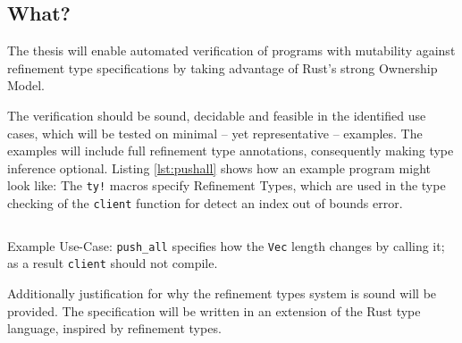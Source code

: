 \documentclass[11pt]{article}
\newcommand{\code}[1]{\texttt{#1}}
\begin{document}






\subsection{What?}

The thesis will enable automated verification of programs with mutability against refinement type specifications by taking advantage of Rust's strong Ownership Model.

The verification should be sound, decidable and feasible in the identified use cases, which will be tested on minimal -- yet representative -- examples. The examples will include full refinement type annotations, consequently making type inference optional. Listing \ref{lst:pushall} shows how an example program might look like: The \code{ty!} macros specify Refinement Types, which are used in the type checking of the \code{client} function for detect an index out of bounds error.


\begin{listing}
	\inputminted[fontsize=\footnotesize]{rust}{./pushall.rs}
	\caption{Example Use-Case: \code{push\_all} specifies how the \code{Vec} length changes by calling it; as a result \code{client} should not compile.}
	\label{lst:pushall}
\end{listing}

Additionally justification for why the refinement types system is sound will be provided.
The specification will be written in an extension of the Rust type language, inspired by refinement types.
\end{document}
